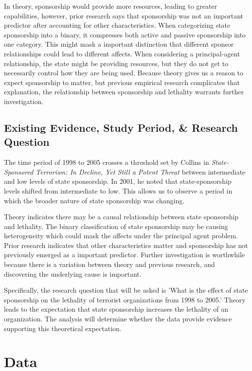 \documentclass{article}
\begin{document}
In theory, sponsorship would provide more resources, leading to greater capabilities, however, prior research says that sponsorship was not an important predictor after accounting for other characteristics. When categorizing state sponsorship into a binary, it compresses both active and passive sponsorship into one category. This might mask a important distinction that different sponsor relationships could lead to different affects. When considering a principal-agent relationship, the state might be providing resources, but they do not get to necessarily control how they are being used. Because theory gives us a reason to expect sponsorship to matter, but previous empirical research complicates that explanation, the relationship between sponsorship and lethality warrants further investigation.

\subsection{Existing Evidence, Study Period, \& Research Question}
The time period of 1998 to 2005 crosses a threshold set by Collins in \textit{State-Sponsored Terrorism: In Decline, Yet Still a Potent Threat} between intermediate and low levels of state sponsorship. In 2001, he noted that state-sponsorship levels shifted from intermediate to low. This allows us to observe a period in which the broader nature of state sponsorship was changing.

Theory indicates there may be a causal relationship between state sponsorship and lethality. The binary classification of state sponsorship may be causing heterogeneity which could mask the affects under the principal agent problem. Prior research indicates that other characteristics matter and sponsorship has not previously emerged as a important predictor. Further investigation is worthwhile because there is a variation between theory and previous research, and discovering the underlying cause is important.

Specifically, the research question that will be asked is 'What is the effect of state sponsorship on the lethality of terrorist organizations from 1998 to 2005.' Theory leads to the expectation that state sponsorship increases the lethality of an organization. The analysis will determine whether the data provide evidence supporting this theoretical expectation. 

\section{Data}
\end{document}
